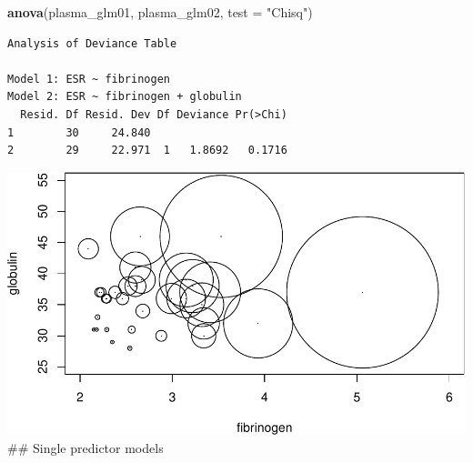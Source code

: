 \documentclass[
]{article}
\newenvironment{Shaded}{\begin{snugshade}}{\end{snugshade}}
\newcommand{\CommentTok}[1]{\textcolor[rgb]{0.56,0.35,0.01}{\textit{#1}}}
\newcommand{\DataTypeTok}[1]{\textcolor[rgb]{0.13,0.29,0.53}{#1}}
\newcommand{\DecValTok}[1]{\textcolor[rgb]{0.00,0.00,0.81}{#1}}
\newcommand{\KeywordTok}[1]{\textcolor[rgb]{0.13,0.29,0.53}{\textbf{#1}}}
\newcommand{\NormalTok}[1]{#1}
\newcommand{\OperatorTok}[1]{\textcolor[rgb]{0.81,0.36,0.00}{\textbf{#1}}}
\newcommand{\OtherTok}[1]{\textcolor[rgb]{0.56,0.35,0.01}{#1}}
\newcommand{\StringTok}[1]{\textcolor[rgb]{0.31,0.60,0.02}{#1}}
\begin{document}
\begin{Shaded}
\begin{Highlighting}[]
\KeywordTok{anova}\NormalTok{(plasma_glm01, plasma_glm02, }\DataTypeTok{test =} \StringTok{"Chisq"}\NormalTok{)}
\end{Highlighting}
\end{Shaded}

\begin{verbatim}
Analysis of Deviance Table

Model 1: ESR ~ fibrinogen
Model 2: ESR ~ fibrinogen + globulin
  Resid. Df Resid. Dev Df Deviance Pr(>Chi)
1        30     24.840                     
2        29     22.971  1   1.8692   0.1716
\end{verbatim}

\begin{Shaded}
\end{Shaded}

\includegraphics{LogisticRegressionCh5_files/figure-latex/unnamed-chunk-6-1.pdf}
\#\# Single predictor models
\end{document}
